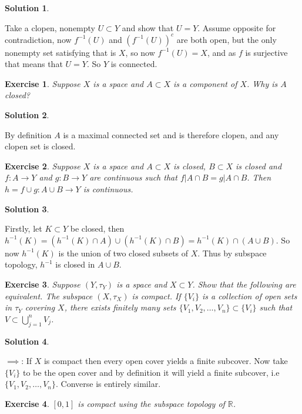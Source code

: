 \documentclass[11pt,a4paper]{article}
\newtheorem{Ex}{Exercise}
\newtheorem{Sol}{Solution}
\begin{document}
\begin{Sol} \end{Sol}
\noindent Take a clopen, nonempty $U \subset Y$ and show that $U = Y$. Assume opposite for contradiction, now $f^{-1}(U)$ and $(f^{-1}(U))^c$ are both open, but the only nonempty set satisfying that is $X$, so now $f^{-1}(U) = X$, and as $f$ is surjective that means that $U = Y$. So $Y$ is connected.

\begin{Ex}
	Suppose $X$ is a space and $A \subset X$ is a component of $X$. Why is $A$ closed?
\end{Ex}

\begin{Sol} \end{Sol}
\noindent By definition $A$ is a maximal connected set and is therefore clopen, and any clopen set is closed.

\begin{Ex}
	Suppose $X$ is a space and $A \subset X$ is closed, $B \subset X$ is closed and $f: A \rightarrow Y$ and $g: B \rightarrow Y$ are continuous such that $f|A \cap B = g|A\cap B$. Then $h = f \cup g: A\cup B \rightarrow Y$ is continuous.
\end{Ex}

\begin{Sol} \end{Sol}
\noindent Firstly, let $K \subset Y$ be closed, then $h^{-1}(K) = (h^{-1}(K) \cap A) \cup (h^{-1}(K) \cap B) = h^{-1}(K) \cap (A \cup B)$. So now $h^{-1}(K)$ is the union of two closed subsets of $X$. Thus by subspace topology, $h^{-1}$ is closed in $A \cup B$.

\begin{Ex}
	Suppose $(Y, \tau_Y)$ is a space and $X \subset Y$. Show that the following are equivalent. The subspace $(X, \tau_X)$ is compact. If $\{V_i\}$ is a collection of open sets in $\tau_Y$ covering  $X$, there exists finitely many sets $\{V_1, V_2, \dots ,V_n\} \subset \{V_i\}$ such that $V \subset \bigcup_{j=1}^n V_j$.

\end{Ex}

\begin{Sol} \end{Sol}
\noindent $\implies$: If $X$ is compact then every open cover yields a finite subcover. Now take $\{V_i\}$ to be the open cover and by definition it will yield a finite subcover, i.e $\{V_1, V_2, \dots ,V_n \}$. Converse is entirely similar. 

\begin{Ex}
	$[0,1]$ is compact using the subspace topology of $\mathbb{R}$.
\end{Ex}
\end{document}
